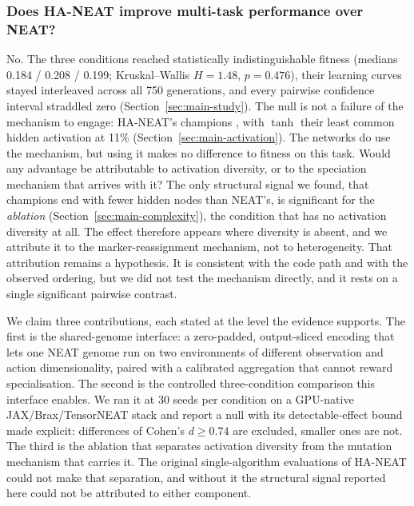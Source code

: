 \subsubsection{Does HA-NEAT improve multi-task performance over NEAT?}
No.
The three conditions reached statistically indistinguishable fitness (medians 0.184 / 0.208 / 0.199; Kruskal--Wallis $H = 1.48$, $p = 0.476$), their learning curves stayed interleaved across all 750 generations, and every pairwise confidence interval straddled zero (Section~\ref{sec:main-study}).
The null is not a failure of the mechanism to engage: HA-NEAT's champions , with $\tanh$ their least common hidden activation at 11\% (Section~\ref{sec:main-activation}).
The networks do use the mechanism, but using it makes no difference to fitness on this task.
 Would any advantage be attributable to activation diversity, or to the speciation mechanism that arrives with it?
The only structural signal we found, that champions end with fewer hidden nodes than NEAT's, is significant for the \emph{ablation} (Section~\ref{sec:main-complexity}), the condition that has no activation diversity at all.
The effect therefore appears where diversity is absent, and we attribute it to the marker-reassignment mechanism, not to heterogeneity.
That attribution remains a hypothesis. It is consistent with the code path and with the observed ordering, but we did not test the mechanism directly, and it rests on a single significant pairwise contrast.

We claim three contributions, each stated at the level the evidence supports.
The first is the shared-genome interface: a zero-padded, output-sliced encoding that lets one NEAT genome run on two environments of different observation and action dimensionality, paired with a calibrated aggregation that cannot reward specialisation.
The second is the controlled three-condition comparison this interface enables. We ran it at 30 seeds per condition on a GPU-native JAX/Brax/TensorNEAT stack and report a null with its detectable-effect bound made explicit: differences of Cohen's $d \geq 0.74$ are excluded, smaller ones are not.
The third is the ablation that separates activation diversity from the mutation mechanism that carries it. The original single-algorithm evaluations of HA-NEAT could not make that separation, and without it the structural signal reported here could not be attributed to either component.

